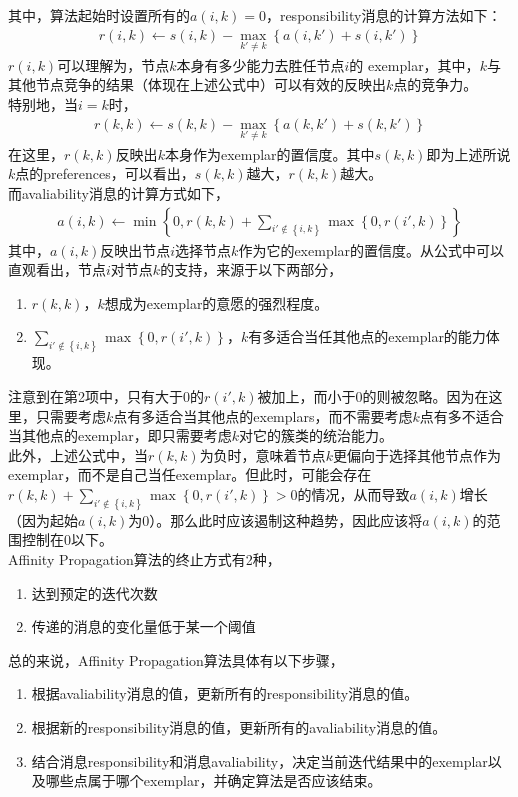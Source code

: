 \documentclass[a4paper]{article}
\begin{document}
其中，算法起始时设置所有的$a(i,k)=0$，responsibility消息的计算方法如下：
\begin{align}
r(i,k)\leftarrow s(i,k) - \max_{k'\neq k} \left\{ a(i,k') + s(i,k') \right\}
\end{align}
$r(i,k)$可以理解为，节点$k$本身有多少能力去胜任节点$i$的 exemplar，其中，$k$与其他节点竞争的结果（体现在上述公式中）可以有效的反映出$k$点的竞争力。\\
\indent 特别地，当$i=k$时，
\begin{align}
r(k,k)\leftarrow s(k,k) - \max_{k'\neq k} \left\{ a(k,k') + s(k,k') \right\}
\end{align}
在这里，$r(k,k)$反映出$k$本身作为exemplar的置信度。其中$s(k,k)$即为上述所说$k$点的preferences，可以看出，$s(k,k)$越大，$r(k,k)$越大。\\
\indent 而avaliability消息的计算方式如下，
\begin{align}
a(i,k)\leftarrow \min \left\{ 0, r(k,k) + \sum_{i'\notin \left\{ i,k \right\}} \max \left\{ 0, r(i',k) \right\} \right\}
\end{align}
其中，$a(i,k)$反映出节点$i$选择节点$k$作为它的exemplar的置信度。从公式中可以直观看出，节点$i$对节点$k$的支持，来源于以下两部分，
\begin{enumerate}
    \item $r(k,k)$，$k$想成为exemplar的意愿的强烈程度。
    \item $\sum_{i'\notin \left\{ i,k \right\}} \max \left\{ 0, r(i',k) \right\}$，$k$有多适合当任其他点的exemplar的能力体现。
\end{enumerate}
注意到在第2项中，只有大于0的$r(i',k)$被加上，而小于0的则被忽略。因为在这里，只需要考虑$k$点有多适合当其他点的exemplars，而不需要考虑$k$点有多不适合当其他点的exemplar，即只需要考虑$k$对它的簇类的统治能力。\\
\indent 此外，上述公式中，当$r(k,k)$为负时，意味着节点$k$更偏向于选择其他节点作为exemplar，而不是自己当任exemplar。但此时，可能会存在$r(k,k) + \sum_{i'\notin \left\{ i,k \right\}} \max \left\{ 0, r(i',k) \right\} > 0$的情况，从而导致$a(i,k)$增长（因为起始$a(i,k)$为0）。那么此时应该遏制这种趋势，因此应该将$a(i,k)$的范围控制在0以下。\\
\indent Affinity Propagation算法的终止方式有2种，
\begin{enumerate}
    \item 达到预定的迭代次数
    \item 传递的消息的变化量低于某一个阈值
\end{enumerate}

总的来说，Affinity Propagation算法具体有以下步骤，
\begin{enumerate}
    \item 根据avaliability消息的值，更新所有的responsibility消息的值。
    \item 根据新的responsibility消息的值，更新所有的avaliability消息的值。
    \item 结合消息responsibility和消息avaliability，决定当前迭代结果中的exemplar以及哪些点属于哪个exemplar，并确定算法是否应该结束。
\end{enumerate}
\end{document}
